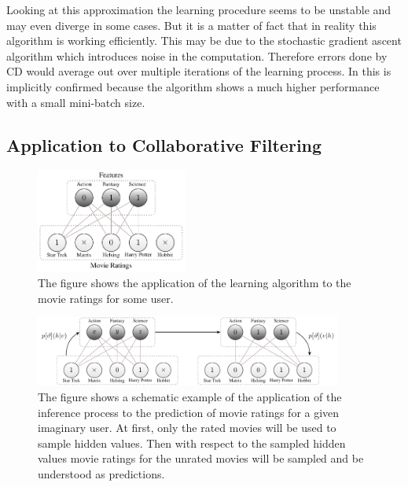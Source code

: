 \documentclass[crop=false,10pt]{standalone}
\begin{document}
      Looking at this approximation the learning procedure seems to be unstable and may even diverge in some cases.
      But it is a matter of fact that in reality this algorithm is working efficiently.
      This may be due to the stochastic gradient ascent algorithm which introduces noise in the computation.
      Therefore errors done by CD would average out over multiple iterations of the learning process.
      In \cite{Hinton2010} this is implicitly confirmed because the algorithm shows a much higher performance with a small mini-batch size.
      \cite{Hinton2010,Murphy2012}

    \subsection{Application to Collaborative Filtering} %
    \label{sub:application_to_collaborative_filtering}
      \begin{figure}
        \center
        \includegraphics[width=0.441\textwidth]{figures/rbm-learning-example.pdf}
        \caption{%
          The figure shows the application of the learning algorithm to the movie ratings for some user.
        }
        \label{fig:rbm-learning-example}
      \end{figure}
    \begin{figure}
      \center
      \includegraphics[width=0.9\textwidth]{figures/rbm-inference-example.pdf}
      \caption{%
        The figure shows a schematic example of the application of the inference process to the prediction of movie ratings for a given imaginary user.
        At first, only the rated movies will be used to sample hidden values.
        Then with respect to the sampled hidden values movie ratings for the unrated movies will be sampled and be understood as predictions.
      }
      \label{fig:rbm-inference-example}
    \end{figure}
\end{document}

